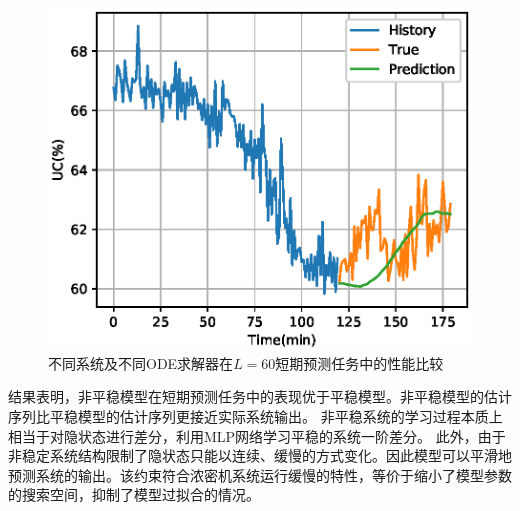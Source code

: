 \begin{figure}[h]
{\begin{minipage}[t]{0.33\linewidth}
\includegraphics[width=\linewidth,trim=12 0 0 20,clip]{figures/chapter3/predict_cmp/UC_MLP_nonsta_dopri5_60.eps}
\end{minipage}
}%
\centering
\caption{不同系统及不同ODE求解器在$L=60$短期预测任务中的性能比较}
\label{fig:predict_cmp_60}
\end{figure}

结果表明，非平稳模型在短期预测任务中的表现优于平稳模型。非平稳模型的估计序列比平稳模型的估计序列更接近实际系统输出。
非平稳系统的学习过程本质上相当于对隐状态进行差分，利用MLP网络学习平稳的系统一阶差分。
此外，由于非稳定系统结构限制了隐状态只能以连续、缓慢的方式变化。因此模型可以平滑地预测系统的输出。该约束符合浓密机系统运行缓慢的特性，等价于缩小了模型参数的搜索空间，抑制了模型过拟合的情况。

